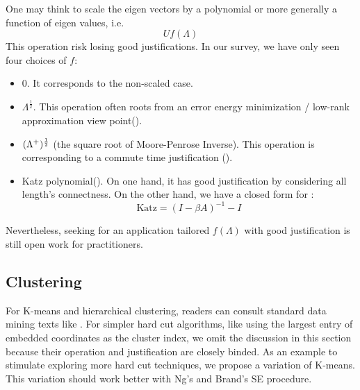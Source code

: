 One may think to scale the eigen vectors by a polynomial or 
more generally a function of eigen values, i.e.
\begin{equation}
	U f(\Lambda)
	\label{eq:post_scale_f}
\end{equation}
This operation risk losing good justifications. In our survey, 
we have only seen four choices of $ f $:
\begin{itemize}
	\item 0. It corresponds to the non-scaled case. 
	\item $ \Lambda^{\frac{1}{2}} $. This operation often roots 
	from an error energy minimization / low-rank approximation
	view point(\rsec{\ref{sec:lrapprox}}).
	\item $ (\Lambda^{+})^{\frac{1}{2}} $
	(the square root of Moore-Penrose Inverse\cite{wiki_mpinv}). 
	This operation is corresponding to a commute time justification
	(\rsec{\ref{sec:commute}}). 
	\item Katz polynomial(\req{\ref{eq:katz}}). On one hand, 
	it has good justification by considering all length's 
	connectness. On the other hand, we have a closed form for 
	\req{\ref{eq:katz}}:\cite{aggarwal2011social}
		\begin{equation}
			\text{Katz} = (I - \beta A)^{-1} - I
		\end{equation}
\end{itemize}
Nevertheless, seeking for an application tailored $ f(\Lambda) $
with good justification is still open work for practitioners. 

\subsection{Clustering}

For K-means and hierarchical clustering, readers
can consult standard data mining texts like \cite{jiawei2001data}.
For simpler hard cut algorithms, like using the 
largest entry of embedded coordinates as the cluster index, 
we omit the discussion in this section because their operation 
and justification are closely binded. As an example 
to stimulate exploring more hard cut techniques, we propose 
a variation of K-means. This variation should work better with 
Ng's \cite{ng2002spectral} and Brand's \cite{brand2003unifying} 
SE procedure. 

